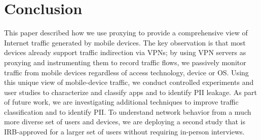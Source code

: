 \section{Conclusion}
\label{sec:conclusion}

This paper described how we use proxying to provide a comprehensive view of Internet traffic 
generated by mobile devices. The key observation is that most devices already support traffic 
indirection via VPNs; by using VPN servers as proxying and instrumenting them to record 
traffic flows, we passively monitor traffic from mobile devices regardless of access 
technology, device or OS. Using this unique view of mobile-device traffic, we conduct 
controlled experiments and user studies to characterize and classify apps and to identify 
PII leakage. As part of future work, we are investigating additional 
techniques to improve traffic classification and to identify PII. To understand network 
behavior from a much more diverse set of users and devices, we are deploying 
a second study that is IRB-approved for a larger set of users without requiring 
in-person interviews. 